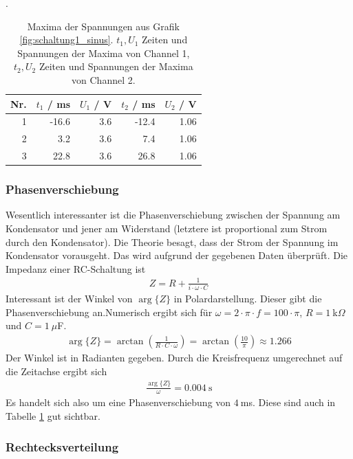\documentclass{article}
\begin{document}
\begin{table}[H]
\caption{Maxima der Spannungen  aus Grafik \ref{fig:schaltung1_sinus}. $t_1, U_1$ Zeiten und Spannungen der Maxima von Channel 1,  $t_2, U_2$ Zeiten und Spannungen der Maxima von Channel 2.}.
\label{tab:minmax}
\begin{tabular}{r|rr|rr}
Nr. & $t_1$ / ms & $U_1$ / V & $t_2$ / ms & $U_2$ / V \\
\hline
1 & -16.6 & 3.6 & -12.4 & 1.06\\
2 & 3.2 & 3.6  & 7.4 & 1.06\\
3 & 22.8 & 3.6 & 26.8 & 1.06
\end{tabular}
\end{table}



\subsubsection{Phasenverschiebung}

Wesentlich interessanter ist die Phasenverschiebung zwischen der Spannung am Kondensator und jener am Widerstand (letztere ist proportional zum Strom durch den Kondensator). Die Theorie besagt, dass der Strom der Spannung im Kondensator vorausgeht. Das wird aufgrund der gegebenen Daten überprüft. Die Impedanz einer RC-Schaltung ist
\begin{align*}
Z = R + \frac{1}{i\cdot \omega\cdot C}
\end{align*}
Interessant ist der Winkel von $\operatorname{arg}\{Z\}$ in Polardarstellung. Dieser gibt die Phasenverschiebung an.Numerisch ergibt sich für $\omega = 2\cdot\pi\cdot f = 100\cdot \pi$, $R=1~$k$\Omega$ und $C=1~\mu$F.
\begin{align*}
\operatorname{arg}\{Z\} = \operatorname{arctan}\left(\frac{1}{R\cdot C\cdot \omega}\right) = \operatorname{arctan}\left( \frac{10}{\pi}\right) \approx 1.266
\end{align*}
Der Winkel ist in Radianten gegeben. Durch die Kreisfrequenz umgerechnet auf die Zeitachse ergibt sich
\begin{align*}
\frac{\operatorname{arg}\{Z\}}{\omega} = 0.004~\text{s}
\end{align*}
Es handelt sich also um eine Phasenverschiebung von $4~$ms. Diese sind auch in Tabelle \ref{tab:minmax} gut sichtbar.





\subsubsection{Rechtecksverteilung}
\end{document}
